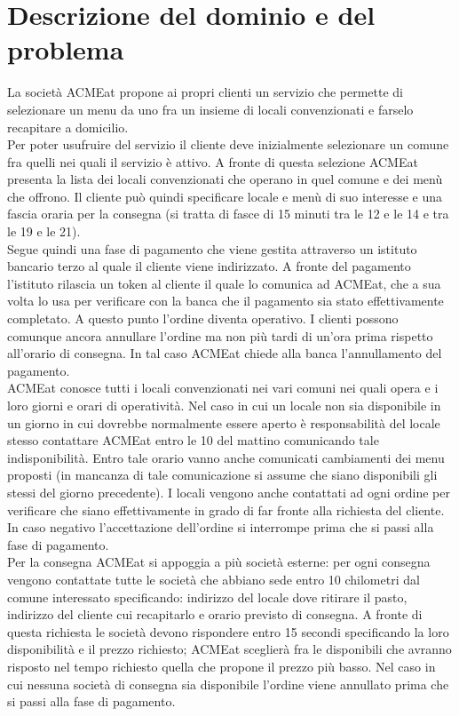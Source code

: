 \documentclass[11pt]{article} %
\begin{document}
\clearpage

\section{Descrizione del dominio e del problema}
\label{sez:ddp}
La società ACMEat propone ai propri clienti un servizio che permette di selezionare un menu da uno fra un insieme di locali convenzionati e farselo recapitare a domicilio.\\
Per poter usufruire del servizio il cliente deve inizialmente selezionare un comune fra quelli nei quali il servizio è attivo. A fronte di questa selezione ACMEat presenta la lista dei locali convenzionati che operano in quel comune e dei menù che offrono. Il cliente può quindi specificare locale e menù di suo interesse e una fascia oraria per la consegna (si tratta di fasce di 15 minuti tra le 12 e le 14 e tra le 19 e le 21).\\
Segue quindi una fase di pagamento che viene gestita attraverso un istituto bancario terzo al quale il cliente viene indirizzato. A fronte del pagamento l’istituto rilascia un token al cliente il quale lo comunica ad ACMEat, che a sua volta lo usa per verificare con la banca che il pagamento sia stato effettivamente completato. A questo punto l’ordine diventa operativo. I clienti possono comunque ancora annullare l’ordine ma non più tardi di un’ora prima rispetto all’orario di consegna. In tal caso ACMEat chiede alla banca l’annullamento del pagamento.\\
ACMEat conosce tutti i locali convenzionati nei vari comuni nei quali opera e i loro giorni e orari di operatività. Nel caso in cui un locale non sia disponibile in un giorno in cui dovrebbe normalmente essere aperto è responsabilità del locale stesso contattare ACMEat entro le 10 del mattino comunicando tale indisponibilità. Entro tale orario vanno anche comunicati cambiamenti dei menu proposti (in mancanza di tale comunicazione si assume che siano disponibili gli stessi del giorno precedente). I locali vengono anche contattati ad ogni ordine per verificare che siano effettivamente in grado di far fronte alla richiesta del cliente. In caso negativo l’accettazione dell’ordine si interrompe prima che si passi alla fase di pagamento.\\
Per la consegna ACMEat si appoggia a più società esterne: per ogni consegna vengono contattate tutte le società che abbiano sede entro 10 chilometri dal comune interessato specificando: indirizzo del locale dove ritirare il pasto, indirizzo del cliente cui recapitarlo e orario previsto di consegna. A fronte di questa richiesta le società devono rispondere entro 15 secondi specificando la loro disponibilità e il prezzo richiesto; ACMEat sceglierà fra le disponibili che avranno risposto nel tempo richiesto quella che propone il prezzo più basso. Nel caso in cui nessuna società di consegna sia disponibile l’ordine viene annullato prima che si passi alla fase di pagamento.
\end{document}
